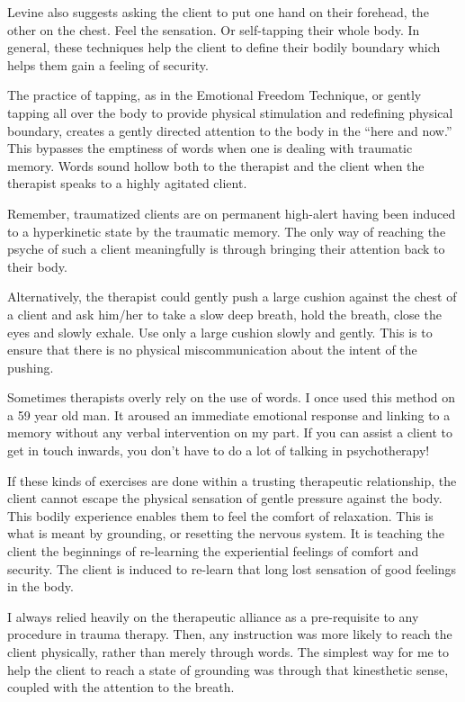 \documentclass[]{book}
\begin{document}
Levine also suggests asking the client to put one hand on their forehead, the other on the chest. Feel the sensation. Or self-tapping their whole body. In general, these techniques help the client to define their bodily boundary which helps them gain a feeling of security.

The practice of tapping, as in the Emotional Freedom Technique, or gently tapping all over the body to provide physical stimulation and redefining physical boundary, creates a gently directed attention to the body in the ``here and now.'' This bypasses the emptiness of words when one is dealing with traumatic memory. Words sound hollow both to the therapist and the client when the therapist speaks to a highly agitated client.

Remember, traumatized clients are on permanent high-alert having been induced to a hyperkinetic state by the traumatic memory. The only way of reaching the psyche of such a client meaningfully is through bringing their attention back to their body.

Alternatively, the therapist could gently push a large cushion against the chest of a client and ask him/her to take a slow deep breath, hold the breath, close the eyes and slowly exhale. Use only a large cushion slowly and gently. This is to ensure that there is no physical miscommunication about the intent of the pushing.

Sometimes therapists overly rely on the use of words. I once used this method on a 59 year old man. It aroused an immediate emotional response and linking to a memory without any verbal intervention on my part. If you can assist a client to get in touch inwards, you don't have to do a lot of talking in psychotherapy!

If these kinds of exercises are done within a trusting therapeutic relationship, the client cannot escape the physical sensation of gentle pressure against the body. This bodily experience enables them to feel the comfort of relaxation. This is what is meant by grounding, or resetting the nervous system. It is teaching the client the beginnings of re-learning the experiential feelings of comfort and security. The client is induced to re-learn that long lost sensation of good feelings in the body.

I always relied heavily on the therapeutic alliance as a pre-requisite to any procedure in trauma therapy. Then, any instruction was more likely to reach the client physically, rather than merely through words. The simplest way for me to help the client to reach a state of grounding was through that kinesthetic sense, coupled with the attention to the breath.
\end{document}
